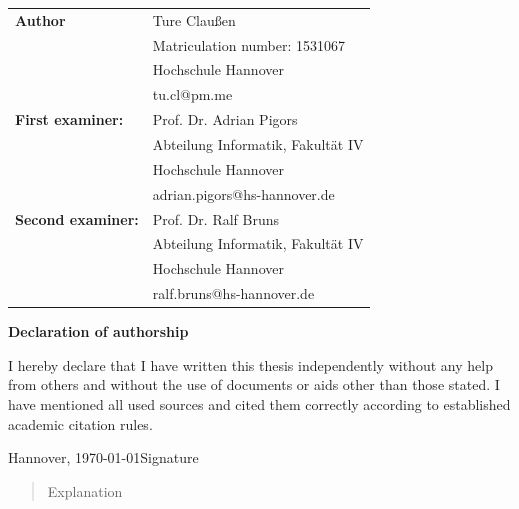 \documentclass[fontsize=12pt,paper=a4,twoside,parskip=half-,headsepline,headinclude, abstract=on]{scrreprt}
\begin{document}
\newpage \thispagestyle{empty}
\begin{tabular}{ll}
    {\bfseries\sffamily Author}           & Ture Claußen                      \\
                                          & Matriculation number: 1531067     \\
                                          & Hochschule Hannover               \\
                                          & tu.cl@pm.me                       \\[5ex]
    {\bfseries\sffamily First examiner:}  & Prof. Dr. Adrian Pigors           \\
                                          & Abteilung Informatik, Fakultät IV \\
                                          & Hochschule Hannover               \\
                                          & adrian.pigors@hs-hannover.de      \\[5ex]
    {\bfseries\sffamily Second examiner:} & Prof. Dr. Ralf Bruns              \\
                                          & Abteilung Informatik, Fakultät IV \\
                                          & Hochschule Hannover               \\
                                          & ralf.bruns@hs-hannover.de
\end{tabular}

\vfill

\begin{center} \sffamily\bfseries Declaration of authorship \end{center}

I hereby declare that I have written this thesis independently without any help from others and without the use of documents or aids other than those stated. I have mentioned all used sources and cited them correctly according to established academic citation rules.
\vspace*{7ex}

Hannover, \today \hfill Signature
\tableofcontents

\begin{abstract}
    Explanation
\end{abstract}










\end{document}
